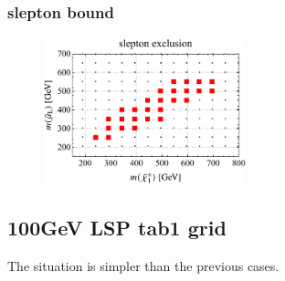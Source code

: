 \documentclass[a4paper,10pt,captions=tableheading,DIV=14]{scrartcl}
\numberwithin{equation}{section}
\begin{document}
\subsubsection{slepton bound}
\begin{figure}[h!]\centering
  \includegraphics[height=120pt]{../plots/plot_tab2slep_limit.pdf}
\end{figure}

\clearpage
\subsection{100GeV LSP tab1 grid}
The situation is simpler than the previous cases.
\end{document}
